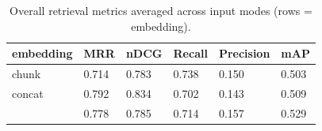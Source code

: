 \begin{table}
\caption{Overall retrieval metrics averaged across input modes (rows = embedding).}
\label{tab:overview-by-embedding}
\begin{tabular}{llllll}
\toprule
embedding & MRR & nDCG & Recall & Precision & mAP \\
\midrule
chunk & 0.714 & 0.783 & 0.738 & 0.150 & 0.503 \\
concat & 0.792 & 0.834 & 0.702 & 0.143 & 0.509 \\
 & 0.778 & 0.785 & 0.714 & 0.157 & 0.529 \\
\bottomrule
\end{tabular}
\end{table}
